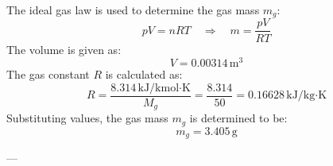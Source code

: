 The ideal gas law is used to determine the gas mass \( m_g \):  
\[
p V = n R T \quad \Rightarrow \quad m = \frac{p V}{R T}
\]  
The volume is given as:  
\[
V = 0.00314 \, \text{m}^3
\]  
The gas constant \( R \) is calculated as:  
\[
R = \frac{8.314 \, \text{kJ}/\text{kmol·K}}{M_g} = \frac{8.314}{50} = 0.16628 \, \text{kJ}/\text{kg·K}
\]  
Substituting values, the gas mass \( m_g \) is determined to be:  
\[
m_g = 3.405 \, \text{g}
\]  

---